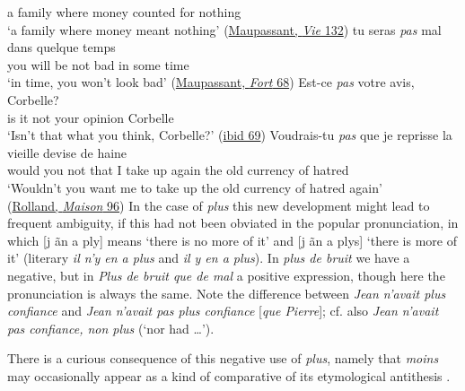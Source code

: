  a family where money counted for nothing\\
\glt `a family where money meant nothing'
\hfill(\href{https://fr.wikisource.org/wiki/Une_vie/VII}{Maupassant, \textit{Vie} 132}) 
\ex
\gll tu seras \textit{pas} mal dans quelque temps\\
 you {will be} not bad in some time\\
\glt `in time, you won't look bad'
\hfill(\href{https://archive.org/details/fortcommelamort00maupuoft/page/72/mode/2up?q=%22tu+seras+pas+mal+dans+quelque+temps%22&view=theater}{Maupassant, \textit{Fort} 68})
\ex
\gll Est-ce \textit{pas} votre avis, Corbelle?\\
 {is it} not your opinion Corbelle\\
\glt `Isn't that what you think, Corbelle?'
\hfill(\href{https://archive.org/details/fortcommelamort00maupuoft/page/74/mode/2up?q=%22est-ce+pas%22&view=theater}{ibid 69}) %
\ex
\gll Voudrais-tu \textit{pas} que je reprisse la vieille devise de haine\\
 {would you} not that I {take up again} the old currency of hatred\\
\glt `Wouldn't you want me to take up the old currency of hatred again'
\\
\hfill(\href{https://archive.org/details/jeanchristop03roll/page/100/mode/2up?q=%22Voudrais-tu+pas+que+je+reprisse+la+vieille+devise+de+haine%22&view=theater}{Rolland, \textit{Maison} 96})
\z
\z
{}In the case of \textit{plus} this new development might lead to frequent ambiguity, if this had not been obviated in the popular pronunciation, in which [j ãn a ply] means `there is no more of it' and [j ãn a plys] `there is more of it' (literary \textit{il n'y en a plus} and \textit{il y en a plus}). In \textit{plus de bruit} we have a negative, but in \textit{Plus de bruit que de mal} a positive expression, though here the pronunciation is always the same. Note the difference between \textit{Jean n'avait plus confiance} and \textit{Jean n'avait pas plus confiance} [\textit{que Pierre}]; cf. also \textit{Jean n'avait pas confiance, non plus} (`nor had {\dots}').

There is a curious consequence of this negative use of \textit{plus}, namely that \textit{moins} may occasionally appear as a kind of comparative of its etymological antithesis .

